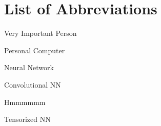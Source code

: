 \section{List of Abbreviations}

\begin{description}[leftmargin=!,labelwidth=2cm]
    \item [VIP] Very Important Person
    \item [PC] Personal Computer
    \item [NN] Neural Network
    \item [CNN] Convolutional NN
    \item [hmm] Hmmmmmm
    \item [TNN] Tensorized NN

\end{description}
